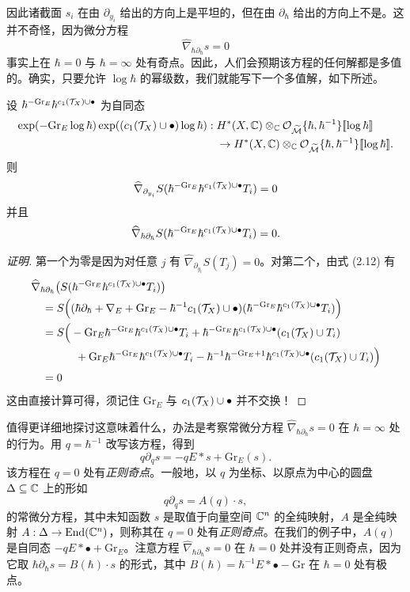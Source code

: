 因此诸截面 $s_i$ 在由 $\partial_{y_i}$ 给出的方向上是平坦的，但在由 $\partial_\hbar$ 给出的方向上不是。这并不奇怪，因为微分方程
\[
\widehat{\nabla}_{\hbar\partial_\hbar}s=0
\]
事实上在 $\hbar=0$ 与 $\hbar=\infty$ 处有奇点。因此，人们会预期该方程的任何解都是多值的。确实，只要允许 $\log\hbar$ 的幂级数，我们就能写下一个多值解，如下所述。

\begin{proposition}
设 $\hbar^{-\mathrm{Gr}_E}\hbar^{c_1(\mathcal{T}_X)\cup\bullet}$ 为自同态
\begin{align*}
\exp(-\mathrm{Gr}_E\log\hbar)\exp((c_1(\mathcal{T}_X)\cup\bullet)\log\hbar):{}&H^*(X,\mathbb{C})\otimes_{\mathbb{C}}\mathcal{O}_{\widetilde{\mathcal{M}}}\{\hbar,\hbar^{-1}\}[\![\log\hbar]\!]\\
&\to H^*(X,\mathbb{C})\otimes_{\mathbb{C}}\mathcal{O}_{\widetilde{\mathcal{M}}}\{\hbar,\hbar^{-1}\}[\![\log\hbar]\!].
\end{align*}
则
\[
\widehat{\nabla}_{\partial_{y_i}}S(\hbar^{-\mathrm{Gr}_E}\hbar^{c_1(\mathcal{T}_X)\cup\bullet}T_i)=0
\]
并且
\[
\widehat{\nabla}_{\hbar\partial_\hbar}S(\hbar^{-\mathrm{Gr}_E}\hbar^{c_1(\mathcal{T}_X)\cup\bullet}T_i)=0.
\]
\end{proposition}

\begin{proof}[证明]
第一个为零是因为对任意 $j$ 有 $\widehat{\nabla}_{\partial_{y_i}}S(T_j)=0$。对第二个，由式 (2.12) 有
\begin{align*}
&\widehat{\nabla}_{\hbar\partial_\hbar}\big(S(\hbar^{-\mathrm{Gr}_E}\hbar^{c_1(\mathcal{T}_X)\cup\bullet}T_i)\big)\\
&\quad=S\Big((\hbar\partial_\hbar+\nabla_E+\mathrm{Gr}_E-\hbar^{-1}c_1(\mathcal{T}_X)\cup\bullet)(\hbar^{-\mathrm{Gr}_E}\hbar^{c_1(\mathcal{T}_X)\cup\bullet}T_i)\Big)\\
&\quad=S\Big(-\mathrm{Gr}_E\hbar^{-\mathrm{Gr}_E}\hbar^{c_1(\mathcal{T}_X)\cup\bullet}T_i+\hbar^{-\mathrm{Gr}_E}\hbar^{c_1(\mathcal{T}_X)\cup\bullet}(c_1(\mathcal{T}_X)\cup T_i)\\
&\qquad\qquad+\mathrm{Gr}_E\hbar^{-\mathrm{Gr}_E}\hbar^{c_1(\mathcal{T}_X)\cup\bullet}T_i-\hbar^{-1}\hbar^{-\mathrm{Gr}_E+1}\hbar^{c_1(\mathcal{T}_X)\cup\bullet}(c_1(\mathcal{T}_X)\cup T_i)\Big)\\
&\quad=0
\end{align*}
这由直接计算可得，须记住 $\mathrm{Gr}_E$ 与 $c_1(\mathcal{T}_X)\cup\bullet$ 并不交换！
\end{proof}

值得更详细地探讨这意味着什么，办法是考察常微分方程 $\widehat{\nabla}_{\hbar\partial_\hbar}s=0$ 在 $\hbar=\infty$ 处的行为。用 $q=\hbar^{-1}$ 改写该方程，得到
\[
q\partial_q s=-qE*s+\mathrm{Gr}_E(s).
\]
该方程在 $q=0$ 处有\emph{正则奇点}。一般地，以 $q$ 为坐标、以原点为中心的圆盘 $\Delta\subseteq\mathbb{C}$ 上的形如
\begin{equation}
q\partial_q s=A(q)\cdot s, \tag{2.13}
\end{equation}
的常微分方程，其中未知函数 $s$ 是取值于向量空间 $\mathbb{C}^n$ 的全纯映射，$A$ 是全纯映射 $A:\Delta\to\mathrm{End}(\mathbb{C}^n)$，则称其在 $q=0$ 处有\emph{正则奇点}。在我们的例子中，$A(q)$ 是自同态 $-qE*\bullet+\mathrm{Gr}_E$。注意方程 $\widehat{\nabla}_{\hbar\partial_\hbar}s=0$ 在 $\hbar=0$ 处并没有正则奇点，因为它取 $\hbar\partial_\hbar s=B(\hbar)\cdot s$ 的形式，其中 $B(\hbar)=\hbar^{-1}E*\bullet-\mathrm{Gr}$ 在 $\hbar=0$ 处有极点。

